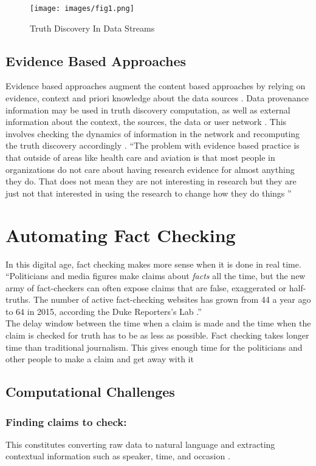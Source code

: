 \documentclass[sigconf]{acmart}
\begin{document}
\begin{figure}
\texttt{[image: images/fig1.png]}
\caption{Truth Discovery In Data Streams \cite{Zhao2014}}
\end{figure}

\subsection{Evidence Based Approaches}
Evidence based approaches augment the content based approaches by relying on evidence, context and priori knowledge about the data sources \cite{Berti-Equille2016}. Data provenance information may be used in truth discovery computation, as well as external information about the context, the sources, the data or user network \cite{Berti-Equille2016}. This involves checking the dynamics of information in the network and recomputing the truth discovery accordingly \cite{Berti-Equille2016}. 
``The problem with evidence based practice is that outside of areas like health care and aviation is that most people in organizations do not care about having research evidence for almost anything they do. That does not mean they are not interesting in research but they are just not that interested in using the research to change how they do things \cite{www-oxford}''

\section{Automating Fact Checking}
In this digital age, fact checking makes more sense when it is done in real time. ``Politicians and media figures make claims about \textit{facts} all the time, but the new army of fact-checkers can often expose claims that are false, exaggerated or half-truths. The number of active fact-checking websites has grown from 44 a year ago to 64 in 2015, according the Duke Reporters’s Lab \cite{Hassan2015}.'' \\
The delay window between the time when a claim is made and the time when the claim is checked for truth has to be as less as possible. Fact checking takes longer time than traditional journalism. This gives enough time for the politicians and other people to make a claim and get away with it \cite{Hassan2015}

\subsection{Computational Challenges} 
\subsubsection{\textbf{Finding claims to check:}} This constitutes converting raw data to natural language and extracting contextual information such as speaker, time, and occasion \cite{Hassan2015}.
\end{document}
